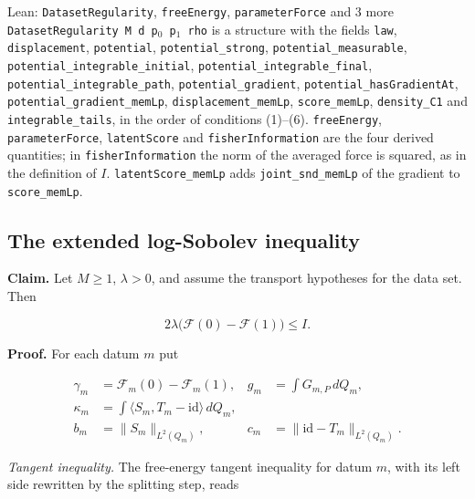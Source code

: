 \documentclass[11pt,a4paper]{report}
\begin{document}
\begin{leanbox}{Lean: \texttt{DatasetRegularity}, \texttt{freeEnergy}, \texttt{parameterForce} and 3 more}
\texttt{Dataset\allowbreak{}Regularity M d p\ensuremath{{}_{0}} p\ensuremath{{}_{1}} rho} is a structure with the fields \texttt{law}, \texttt{displacement}, \texttt{potential}, \texttt{potential\_\allowbreak{}strong}, \texttt{potential\_\allowbreak{}measurable}, \texttt{potential\_\allowbreak{}integrable\_\allowbreak{}initial}, \texttt{potential\_\allowbreak{}integrable\_\allowbreak{}final}, \texttt{potential\_\allowbreak{}integrable\_\allowbreak{}path}, \texttt{potential\_\allowbreak{}gradient}, \texttt{potential\_\allowbreak{}has\allowbreak{}Gradient\allowbreak{}At}, \texttt{potential\_\allowbreak{}gradient\_\allowbreak{}mem\allowbreak{}Lp}, \texttt{displacement\_\allowbreak{}mem\allowbreak{}Lp}, \texttt{score\_\allowbreak{}mem\allowbreak{}Lp}, \texttt{density\_\allowbreak{}C1} and \texttt{integrable\_\allowbreak{}tails}, in the order of conditions (1)–(6). \texttt{free\allowbreak{}Energy}, \texttt{parameter\allowbreak{}Force}, \texttt{latent\allowbreak{}Score} and \texttt{fisher\allowbreak{}Information} are the four derived quantities; in \texttt{fisher\allowbreak{}Information} the norm of the averaged force is squared, as in the definition of \(I\). \texttt{latent\allowbreak{}Score\_\allowbreak{}mem\allowbreak{}Lp} adds \texttt{joint\_\allowbreak{}snd\_\allowbreak{}mem\allowbreak{}Lp} of the gradient to \texttt{score\_\allowbreak{}mem\allowbreak{}Lp}.
\end{leanbox}
\subsection{\texorpdfstring{The extended log-Sobolev inequality}{The extended log-Sobolev inequality}}


\textbf{Claim.} Let \(M\ge1\), \(\lambda>0\), and assume the transport hypotheses for the data set. Then


\[2\lambda\bigl(\mathcal F(0)-\mathcal F(1)\bigr)\le I.\]


\textbf{Proof.} For each datum \(m\) put


\[\begin{aligned}\gamma_m&=\mathcal F_m(0)-\mathcal F_m(1),&g_m&=\int G_{m,P}\,dQ_m,\\\kappa_m&=\int\langle S_m,T_m-\mathrm{id}\rangle\,dQ_m,\\b_m&=\|S_m\|_{L^2(Q_m)},&c_m&=\|\mathrm{id}-T_m\|_{L^2(Q_m)}.\end{aligned}\]


\emph{Tangent inequality.} The free-energy tangent inequality for datum \(m\), with its left side rewritten by the splitting step, reads
\end{document}
